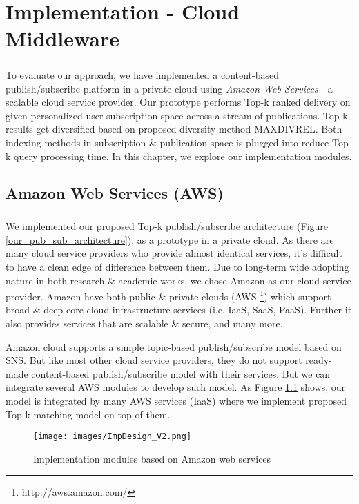 \documentclass[a4paper,12pt,oneside]{book}
\theoremstyle{definition}
\theoremstyle{remark}
\begin{document}
\chapter{Implementation - Cloud Middleware}
\paragraph*{}
To evaluate our approach, we have implemented a content-based publish/subscribe platform in a private cloud using \emph{Amazon Web Services} - a scalable cloud service provider. Our prototype performs Top-k ranked delivery on given personalized user subscription space across a stream of publications. Top-k results get diversified based on proposed diversity method MAXDIVREL. Both indexing methods in subscription \& publication space is plugged into reduce Top-k query processing time. In this chapter, we explore our implementation modules.

\section{Amazon Web Services (AWS)}
\paragraph*{}
We implemented our proposed Top-k publish/subscribe architecture (Figure \ref{our_pub_sub_architecture}), as a prototype in a private cloud. As there are many cloud service providers who provide almost identical services, it's difficult to have a clean edge of difference between them. Due to long-term wide adopting nature in both research \& academic works, we chose Amazon as our cloud service provider. Amazon have both public \& private clouds (\ac{AWS} \footnote{http://aws.amazon.com/}) which support broad \& deep core cloud infrastructure services (i.e. IaaS, SaaS, PaaS). Further it also provides services that are scalable \& secure, and many more.

Amazon cloud supports a simple topic-based publish/subscribe model based on \ac{SNS}. But like most other cloud service providers, they do not support ready-made content-based publish/subscribe model with their services. But we can integrate several \ac{AWS} modules to develop such model. As Figure \ref{imp_pub_sub_architecture} shows, our model is integrated by many \ac{AWS} services (IaaS) where we implement proposed Top-k matching model on top of them.  
\begin{figure}[h]
\begin{center}
\texttt{[image: images/ImpDesign\_V2.png]}
\caption{Implementation modules based on Amazon web services}
\label{imp_pub_sub_architecture}
\end{center}
\end{figure}
\end{document}
